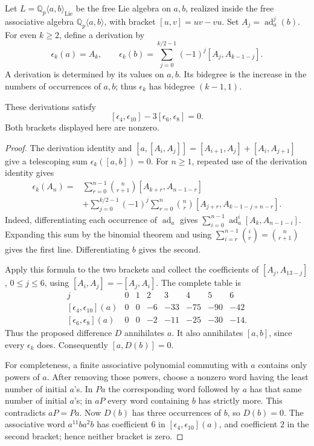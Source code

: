 Let \(L=\mathbb Q_p\langle a,b\rangle_{\mathrm{Lie}}\) be the free
Lie algebra on \(a,b\), realized inside the free associative algebra
\(\mathbb Q_p\langle a,b\rangle\), with bracket \([u,v]=uv-vu\).
Set \(A_j=\operatorname{ad}_a^j(b)\). For even \(k\geq2\), define
a derivation by
\[
 \epsilon_k(a)=A_k,\qquad
 \epsilon_k(b)=\sum_{j=0}^{k/2-1}(-1)^j[A_j,A_{k-1-j}].
\]
A derivation is determined by its values on \(a,b\). Its bidegree
is the increase in the numbers of occurrences of \(a,b\); thus
\(\epsilon_k\) has bidegree \((k-1,1)\).

\begin{proposition}\label{prop:pollack-explicit}
These derivations satisfy
\[
 [\epsilon_4,\epsilon_{10}]-3[\epsilon_6,\epsilon_8]=0.
\]
Both brackets displayed here are nonzero.
\end{proposition}
\begin{proof}
The derivation identity and
\([a,[A_i,A_j]]=[A_{i+1},A_j]+[A_i,A_{j+1}]\)
give a telescoping sum
\(\epsilon_k([a,b])=0\).
For \(n\geq1\), repeated use of the derivation identity gives
\begin{align*}
 \epsilon_k(A_n)
 ={}&\sum_{r=0}^{n-1}\binom{n}{r+1}
              [A_{k+r},A_{n-1-r}]\\
 &+\sum_{j=0}^{k/2-1}(-1)^j
      \sum_{r=0}^{n}\binom nr
              [A_{j+r},A_{k-1-j+n-r}].
\end{align*}
Indeed, differentiating each occurrence of
\(\operatorname{ad}_a\) gives
\(\sum_{i=0}^{n-1}\operatorname{ad}_a^i
[A_k,A_{n-1-i}]\). Expanding this sum by the binomial theorem
and using
\(\sum_{i=r}^{n-1}\binom ir=\binom n{r+1}\)
gives the first line. Differentiating \(b\) gives the second.

Apply this formula to the two brackets and collect the coefficients
of \([A_j,A_{13-j}]\), \(0\leq j\leq6\), using
\([A_i,A_j]=-[A_j,A_i]\). The complete table is
\[
\begin{array}{c|rrrrrrr}
j&0&1&2&3&4&5&6\\ \hline
[\epsilon_4,\epsilon_{10}](a)&0&0&-6&-33&-75&-90&-42\\
{}[\epsilon_6,\epsilon_8](a)&0&0&-2&-11&-25&-30&-14 .
\end{array}
\]
Thus the proposed difference \(D\) annihilates \(a\).
It also annihilates \([a,b]\), since every \(\epsilon_k\) does.
Consequently \([a,D(b)]=0\).

For completeness, a finite associative polynomial commuting with
\(a\) contains only powers of \(a\). After removing those powers,
choose a nonzero word having the least number of initial \(a\)'s.
In \(Pa\) the corresponding word followed by \(a\) has that same
number of initial \(a\)'s; in \(aP\) every word containing \(b\)
has strictly more. This contradicts \(aP=Pa\).
Now \(D(b)\) has three occurrences of \(b\), so \(D(b)=0\).
The associative word \(a^{11}ba^2b\) has coefficient \(6\) in
\([\epsilon_4,\epsilon_{10}](a)\), and coefficient \(2\) in the
second bracket; hence neither bracket is zero.
\end{proof}

